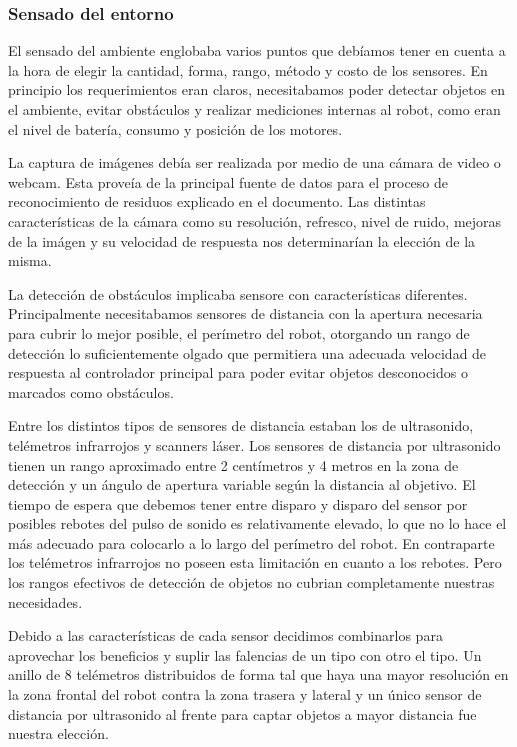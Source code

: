 \subsubsection{Sensado del entorno}
\label{h_ideas_sensado}

El sensado del ambiente englobaba varios puntos que deb\'iamos tener en cuenta a la hora de elegir
la cantidad, forma, rango, m\'etodo y costo de los sensores.
En principio los requerimientos eran claros, necesitabamos poder detectar objetos en el ambiente,
evitar obst\'aculos y realizar mediciones internas al robot, como eran el nivel de bater\'ia,
consumo y posici\'on de los motores.

La captura de im\'agenes deb\'ia ser realizada por medio de una c\'amara de video o webcam.
Esta prove\'ia de la principal fuente de datos para el proceso de reconocimiento de residuos
explicado en el documento.
Las distintas caracter\'isticas de la c\'amara como su resoluci\'on, refresco, nivel de ruido,
mejoras de la im\'agen y su velocidad de respuesta nos determinar\'ian la elecci\'on de la misma.

La detecci\'on de obst\'aculos implicaba sensore con caracter\'isticas diferentes.
Principalmente necesitabamos sensores de distancia con la apertura necesaria para cubrir lo
mejor posible, el per\'imetro del robot, otorgando un rango de detecci\'on lo suficientemente olgado
que permitiera una adecuada velocidad de respuesta al controlador principal para poder
evitar objetos desconocidos o marcados como obst\'aculos.

Entre los distintos tipos de sensores de distancia estaban los de ultrasonido, tel\'emetros infrarrojos
y scanners l\'aser.
Los sensores de distancia por ultrasonido tienen un rango aproximado entre 2 cent\'imetros y 4 metros
en la zona de detecci\'on y un \'angulo de apertura variable seg\'un la distancia al objetivo.
El tiempo de espera que debemos tener entre disparo y disparo del sensor por posibles rebotes del pulso
de sonido es relativamente elevado, lo que no lo hace el m\'as adecuado para colocarlo a lo largo del
per\'imetro del robot.
En contraparte los tel\'emetros infrarrojos no poseen esta limitaci\'on en cuanto a los rebotes.
Pero los rangos efectivos de detecci\'on de objetos no cubrian completamente nuestras necesidades.

Debido a las caracter\'isticas de cada sensor decidimos combinarlos para aprovechar los beneficios y
suplir las falencias de un tipo con otro el tipo.
Un anillo de 8 tel\'emetros distribuidos de forma tal que haya una mayor resoluci\'on en la zona frontal
del robot contra la zona trasera y lateral y un \'unico sensor de distancia por ultrasonido al frente
para captar objetos a mayor distancia fue nuestra elecci\'on.


